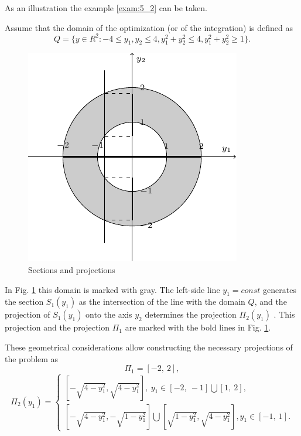 As an illustration the example \ref{exam:5_2} can be taken. 
\begin{example}
\label{exam:5_2}
Assume that the domain of the optimization (or of the integration) is defined as
\begin{displaymath}
Q=\{y\in R^2:-4\leq y_1,y_2\leq 4, y_1^2+y_2^2\leq 4,y_1^2+y_2^2\geq 1\}.
\end{displaymath}
\begin{figure}[t]
\centering
\includegraphics[width=0.8\linewidth]{figures/figure_5_5.pdf}
\caption{Sections and projections}
\label{fig:5_5}    
\end{figure}
In Fig. \ref{fig:5_5} this domain is marked with gray. The left-side line $y_1=const$  generates the section $S_1(y_1)$  as the intersection of the line with the domain $Q$, and the projection  of $S_1(y_1)$  onto the axis $y_2$  determines the projection $\Pi_2(y_1)$ . This projection and the projection $\Pi_1$  are marked with the bold lines in Fig. \ref{fig:5_5}.

These geometrical considerations allow constructing the necessary projections of the problem as 
\begin{displaymath}
\Pi_1=[-2,\:2],
\end{displaymath}
\begin{displaymath}
\Pi_2(y_1)=
  \begin{cases}
    [-\sqrt{4-y_1^2}, \sqrt{4-y_1^2}],\ y_1\in [-2,\:-1]\bigcup [1,\:2],  \\
    [-\sqrt{4-y_1^2}, -\sqrt{1-y_1^2}]\bigcup [\sqrt{1-y_1^2}, \sqrt{4-y_1^2}],y_1\in [-1,\:1].                      	
  \end{cases}
\end{displaymath}
\end{example}

